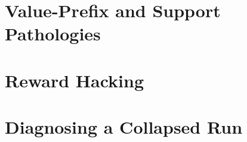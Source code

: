 \section{Value-Prefix and Support Pathologies}\label{sec:failure-value-prefix}


\section{Reward Hacking}\label{sec:failure-reward-hacking}


\section{Diagnosing a Collapsed Run}\label{sec:failure-procedure}

